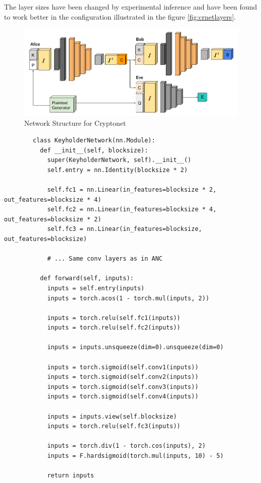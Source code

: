 \documentclass[a4paper]{article}
\begin{document}
      The layer sizes have been changed by experimental inference and have been found to work better in
      the configuration illustrated in the figure \ref{fig:crnetlayers}.

      \begin{figure}[H]
        \centering
        \includegraphics[width=\textwidth]{../ref/crnetstruct.png}
        \caption{Network Structure for Cryptonet}
        \label{fig:crnetstruct}
      \end{figure}

      \begin{lstlisting}
        class KeyholderNetwork(nn.Module):
          def __init__(self, blocksize):
            super(KeyholderNetwork, self).__init__()
            self.entry = nn.Identity(blocksize * 2)

            self.fc1 = nn.Linear(in_features=blocksize * 2, out_features=blocksize * 4)
            self.fc2 = nn.Linear(in_features=blocksize * 4, out_features=blocksize * 2)
            self.fc3 = nn.Linear(in_features=blocksize, out_features=blocksize)
            
            # ... Same conv layers as in ANC

          def forward(self, inputs):    
            inputs = self.entry(inputs)
            inputs = torch.acos(1 - torch.mul(inputs, 2))

            inputs = torch.relu(self.fc1(inputs))
            inputs = torch.relu(self.fc2(inputs))

            inputs = inputs.unsqueeze(dim=0).unsqueeze(dim=0)
            
            inputs = torch.sigmoid(self.conv1(inputs))
            inputs = torch.sigmoid(self.conv2(inputs))
            inputs = torch.sigmoid(self.conv3(inputs))
            inputs = torch.sigmoid(self.conv4(inputs))
            
            inputs = inputs.view(self.blocksize)
            inputs = torch.relu(self.fc3(inputs))

            inputs = torch.div(1 - torch.cos(inputs), 2)
            inputs = F.hardsigmoid(torch.mul(inputs, 10) - 5)

            return inputs
      \end{lstlisting}
\end{document}
